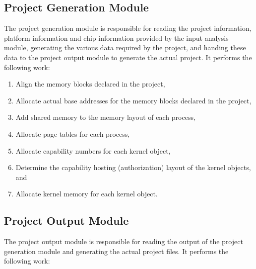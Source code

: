 \subsection{Project Generation Module}\label{subsec:5-1-2}

The project generation module is responsible for reading the project information, platform information and chip information provided by the input analysis module, generating the various data required by the project, and handing these data to the project output module to generate the actual project. It performs the following work:

\begin{enumerate}
\def\labelenumi{\arabic{enumi}.}
\item
  Align the memory blocks declared in the project,
\item
  Allocate actual base addresses for the memory blocks declared in the project,
\item
  Add shared memory to the memory layout of each process,
\item
  Allocate page tables for each process,
\item
  Allocate capability numbers for each kernel object,
\item
  Determine the capability hosting (authorization) layout of the kernel objects, and
\item
  Allocate kernel memory for each kernel object.
\end{enumerate}

\subsection{Project Output Module}\label{subsec:5-1-3}

The project output module is responsible for reading the output of the project generation module and generating the actual project files. It performs the following work:

